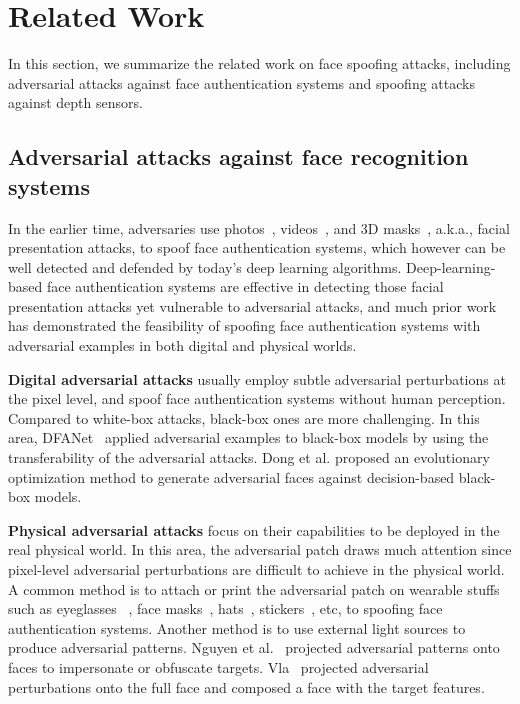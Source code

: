 \section{Related Work}

In this section, we summarize the related work on face spoofing attacks, including adversarial attacks against face authentication systems and spoofing attacks against depth sensors.

\subsection{Adversarial attacks against face recognition systems}
In the earlier time,  adversaries use photos~\cite{chakka2011competition, anjos2011counter}, videos~\cite{raghavendra2015presentation}, and 3D masks~\cite{bhattacharjee2018spoofing, nesli2013spoofing}, a.k.a., facial presentation attacks, to spoof face authentication systems, which however can be well detected and defended by today's deep learning algorithms. 
Deep-learning-based face authentication systems are effective in detecting those facial presentation attacks yet vulnerable to adversarial attacks, and much prior work has demonstrated the feasibility of spoofing face authentication systems with adversarial examples in both digital and physical worlds.

\textbf{Digital adversarial attacks} usually employ subtle adversarial perturbations at the pixel level, and spoof face authentication systems without human perception. Compared to white-box attacks, black-box ones are more challenging. In this area, DFANet~\cite{zhong2020towards} applied adversarial examples to black-box models by using the transferability of the adversarial attacks. Dong et al. \cite{dong2019efficient} proposed an evolutionary optimization method to generate adversarial faces against decision-based black-box models.

\textbf{Physical adversarial attacks} focus on their capabilities to be deployed in the real physical world.  In this area, the adversarial patch draws much attention since pixel-level adversarial perturbations are difficult to achieve in the physical world. %
A common method is to attach or print the adversarial patch on wearable stuffs such as  eyeglasses  ~\cite{sharif2016accessorize,singh2022powerful}, face masks~\cite{zolfi2021adversarial}, hats~\cite{komkov2021advhat}, stickers~\cite{guo2021meaningful}, etc, to spoofing face authentication systems.
Another method is to use external light sources to produce adversarial patterns. Nguyen et al.~\cite{nguyen2020adversarial} projected adversarial patterns onto faces to impersonate or obfuscate targets. Vla~\cite{shen2019vla} projected
adversarial perturbations onto the full face and composed a face with the target features.


